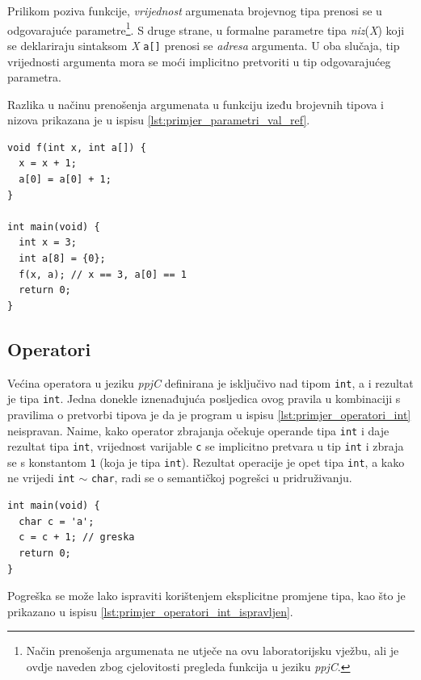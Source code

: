 \documentclass[times, 12pt, utf8]{book}
\begin{document}
Prilikom poziva funkcije, \emph{vrijednost} argumenata brojevnog tipa prenosi se u odgovarajuće parametre\footnote{Način prenošenja argumenata ne utječe na ovu laboratorijsku vježbu, ali je ovdje naveden zbog cjelovitosti pregleda funkcija u jeziku \emph{ppjC}.}.
S druge strane, u formalne parametre tipa \emph{niz}(\emph{X}) koji se deklariraju sintaksom \emph{X} \verb|a[]| prenosi se \emph{adresa} argumenta.
U oba slučaja, tip vrijednosti argumenta mora se moći implicitno pretvoriti u tip odgovarajućeg parametra.

Razlika u načinu prenošenja argumenata u funkciju izeđu brojevnih tipova i nizova prikazana je u ispisu \ref{lst:primjer_parametri_val_ref}.

\begin{lstlisting}[caption={Brojevni tipovi se prenose \emph{razmjenom vrijednosti}. Nizovi se prenose \emph{razmjenom adresa}.},label=lst:primjer_parametri_val_ref]
void f(int x, int a[]) {
  x = x + 1;
  a[0] = a[0] + 1;
}

int main(void) {
  int x = 3;
  int a[8] = {0};
  f(x, a); // x == 3, a[0] == 1
  return 0;
}
\end{lstlisting}

\subsection{Operatori}
Većina operatora u jeziku \emph{ppjC} definirana je isključivo nad tipom \verb|int|, a i rezultat je tipa \verb|int|.
Jedna donekle iznenađujuća posljedica ovog pravila u kombinaciji s pravilima o pretvorbi tipova je da je program u ispisu \ref{lst:primjer_operatori_int} neispravan.
Naime, kako operator zbrajanja očekuje operande tipa \verb|int| i daje rezultat tipa \verb|int|, vrijednost varijable \verb|c| se implicitno pretvara u tip \verb|int| i zbraja se s konstantom \verb|1| (koja je tipa \verb|int|).
Rezultat operacije je opet tipa \verb|int|, a kako ne vrijedi \verb|int| \(\sim\) \verb|char|, radi se o semantičkoj pogrešci u pridruživanju.

\begin{lstlisting}[caption={Neispravan program s operatorom zbrajanja.},label=lst:primjer_operatori_int]
int main(void) {
  char c = 'a';
  c = c + 1; // greska
  return 0;
}
\end{lstlisting}

Pogreška se može lako ispraviti korištenjem eksplicitne promjene tipa, kao što je prikazano u ispisu \ref{lst:primjer_operatori_int_ispravljen}.
\end{document}
